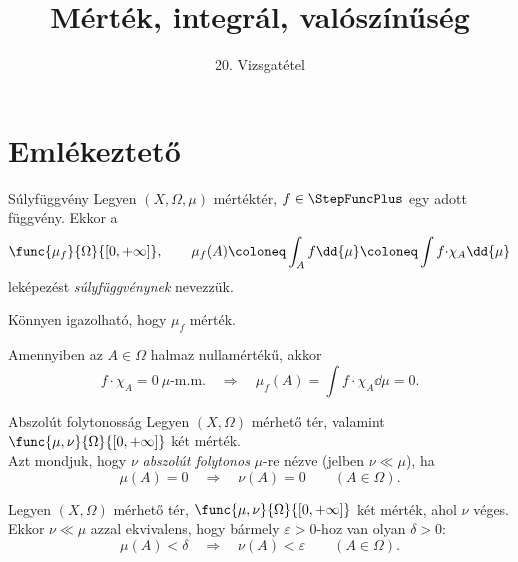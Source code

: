 \documentclass[
]{elteikthesis}[2024/04/26]
\title{Mérték, integrál, valószínűség} %
\subtitle{20. Vizsgatétel}
\begin{document}
	
	
	\section{Emlékeztető}
	
	\begin{definition}{Súlyfüggvény}{}
		Legyen \( (X, \Omega, \mu) \) mértéktér, 
		\( f \in \StepFuncPlus \) egy adott függvény. Ekkor a
		\[
		\func{\mu_f}{\Omega}{[0, +\infty]}, \qquad 
		\mu_f(A) \coloneq 
		\int_A f \dd{\mu} \coloneq 
		\int f {\cdot} \chi_A \dd{\mu}
		\]
		leképezést \emph{súlyfüggvénynek} nevezzük.
	\end{definition}
	
	\begin{notes}
		\item Könnyen igazolható, hogy \( \mu_f \) mérték.
		
		\item Amennyiben az \( A \in \Omega \) halmaz nullamértékű, akkor
		\[
			f {\cdot} \chi_A = 0 \ \mu \text{-m.m.}
			\quad \Longrightarrow \quad
			\mu_f(A) = 
			\int f {\cdot} \chi_A \dd{\mu} =
			0.
		\]
	\end{notes}
	
	\begin{definition}{Abszolút folytonosság}{}
		Legyen \( (X, \Omega) \) mérhető tér, 
		valamint \( \func{\mu, \nu}{\Omega}{[0, +\infty]} \) két mérték.\\[6pt]
		Azt mondjuk, 
		hogy \( \nu \) \emph{abszolút folytonos} \( \mu \)-re nézve (jelben \( \nu \ll \mu \)), ha
		\[
			\mu(A) = 0
			\quad \Longrightarrow \quad
			\nu(A) = 0
			\qquad (A \in \Omega).
		\]
	\end{definition}
	
	\begin{lemma}{}{}
		Legyen \( (X, \Omega) \) mérhető tér, 
		\( \func{\mu, \nu}{\Omega}{[0, +\infty]} \) két mérték, ahol \( \nu \) véges.\\[6pt]
		Ekkor \( \nu \ll \mu \) azzal ekvivalens, hogy
		bármely \( \varepsilon > 0 \)-hoz van olyan \( \delta > 0 \):
		\[
		\mu(A) < \delta
		\quad \Longrightarrow \quad
		\nu(A) < \varepsilon
		\qquad (A \in \Omega).
		\]
	\end{lemma}
	
\end{document}
